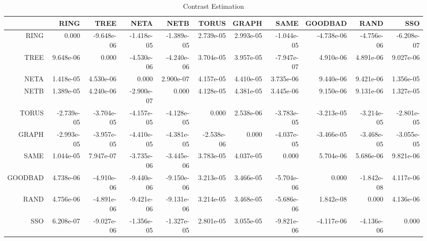 \documentclass[a4paper,10pt]{article}
\begin{document}
\begin{landscape}
\begin{table}[!htp]
\centering\tiny
\caption{Contrast Estimation}
\begin{tabular}{
|r|r|r|r|r|r|r|r|r|r|r|}
\hline
 & RING& TREE& NETA& NETB& TORUS& GRAPH& SAME& GOODBAD& RAND& SSO\\
\hline
 RING&0.000&-9.648e-06&-1.418e-05&-1.389e-05&2.739e-05&2.993e-05&-1.044e-05&-4.738e-06&-4.756e-06&-6.208e-07\\
\hline
 TREE&9.648e-06&0.000&-4.530e-06&-4.240e-06&3.704e-05&3.957e-05&-7.947e-07&4.910e-06&4.891e-06&9.027e-06\\
\hline
 NETA&1.418e-05&4.530e-06&0.000&2.900e-07&4.157e-05&4.410e-05&3.735e-06&9.440e-06&9.421e-06&1.356e-05\\
\hline
 NETB&1.389e-05&4.240e-06&-2.900e-07&0.000&4.128e-05&4.381e-05&3.445e-06&9.150e-06&9.131e-06&1.327e-05\\
\hline
 TORUS&-2.739e-05&-3.704e-05&-4.157e-05&-4.128e-05&0.000&2.538e-06&-3.783e-05&-3.213e-05&-3.214e-05&-2.801e-05\\
\hline
 GRAPH&-2.993e-05&-3.957e-05&-4.410e-05&-4.381e-05&-2.538e-06&0.000&-4.037e-05&-3.466e-05&-3.468e-05&-3.055e-05\\
\hline
 SAME&1.044e-05&7.947e-07&-3.735e-06&-3.445e-06&3.783e-05&4.037e-05&0.000&5.704e-06&5.686e-06&9.821e-06\\
\hline
 GOODBAD&4.738e-06&-4.910e-06&-9.440e-06&-9.150e-06&3.213e-05&3.466e-05&-5.704e-06&0.000&-1.842e-08&4.117e-06\\
\hline
 RAND&4.756e-06&-4.891e-06&-9.421e-06&-9.131e-06&3.214e-05&3.468e-05&-5.686e-06&1.842e-08&0.000&4.136e-06\\
\hline
 SSO&6.208e-07&-9.027e-06&-1.356e-05&-1.327e-05&2.801e-05&3.055e-05&-9.821e-06&-4.117e-06&-4.136e-06&0.000\\
\hline

\end{tabular}
\end{table}

\newpage


\end{landscape}
\end{document}
